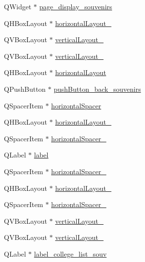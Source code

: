 \begin{DoxyCompactItemize}
\item 
Q\+Widget $\ast$ \hyperlink{class_ui___main_window_aac02c85cd896681bf71b31c8038a20ad}{page\+\_\+display\+\_\+souvenirs}
\item 
Q\+H\+Box\+Layout $\ast$ \hyperlink{class_ui___main_window_a1351e317cba7ca711b6b4d2212b6bf36}{horizontal\+Layout\+\_}
\item 
Q\+V\+Box\+Layout $\ast$ \hyperlink{class_ui___main_window_afb6bb8ab195766b2b18cee42bcdc246b}{vertical\+Layout\+\_}
\item 
Q\+V\+Box\+Layout $\ast$ \hyperlink{class_ui___main_window_ab69a0ed5b8ea1148c5dda9b89cdfbba4}{vertical\+Layout\+\_}
\item 
Q\+H\+Box\+Layout $\ast$ \hyperlink{class_ui___main_window_acd6fdc9ebacc4b25b834162380d75ce8}{horizontal\+Layout}
\item 
Q\+Push\+Button $\ast$ \hyperlink{class_ui___main_window_ac7df56aa883a61d57f27ddc0add1317f}{push\+Button\+\_\+back\+\_\+souvenirs}
\item 
Q\+Spacer\+Item $\ast$ \hyperlink{class_ui___main_window_a7871ea8c4b6c595d7ccd53960b344719}{horizontal\+Spacer}
\item 
Q\+H\+Box\+Layout $\ast$ \hyperlink{class_ui___main_window_a80867018070156432923d0266cc9fe25}{horizontal\+Layout\+\_}
\item 
Q\+Spacer\+Item $\ast$ \hyperlink{class_ui___main_window_a9a022556cf8ce3fa47e51d79cb222ab0}{horizontal\+Spacer\+\_}
\item 
Q\+Label $\ast$ \hyperlink{class_ui___main_window_ad9c89133780f28e6efa2ec17ceb9cff5}{label}
\item 
Q\+Spacer\+Item $\ast$ \hyperlink{class_ui___main_window_ae2007c6e48638f819d3ac57be8daa4ca}{horizontal\+Spacer\+\_}
\item 
Q\+H\+Box\+Layout $\ast$ \hyperlink{class_ui___main_window_ae183387a7d233b437a637b403ba39ffd}{horizontal\+Layout\+\_}
\item 
Q\+Spacer\+Item $\ast$ \hyperlink{class_ui___main_window_a8299c833a893aa2069e6f7ad2f91cd87}{horizontal\+Spacer\+\_}
\item 
Q\+V\+Box\+Layout $\ast$ \hyperlink{class_ui___main_window_afb1464f1d82290bdb55ce9c30a62c2c5}{vertical\+Layout\+\_}
\item 
Q\+V\+Box\+Layout $\ast$ \hyperlink{class_ui___main_window_a7b66d5d6ab55f3977317359d09a42345}{vertical\+Layout\+\_}
\item 
Q\+Label $\ast$ \hyperlink{class_ui___main_window_ab2f72c23310c468a5a0dbfd245b14872}{label\+\_\+college\+\_\+list\+\_\+souv}

\end{DoxyCompactItemize}
